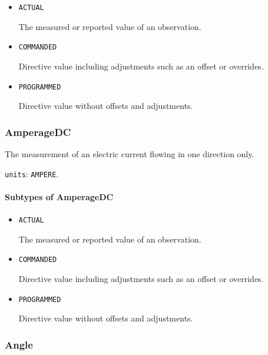 \begin{itemize}

\item \texttt{ACTUAL}


The measured or reported value of an \gls{observation}.

\item \texttt{COMMANDED}


Directive value including adjustments such as an offset or overrides.

\item \texttt{PROGRAMMED}


Directive value without offsets and adjustments.


\end{itemize}






\subsubsection{AmperageDC}
\label{sec:AmperageDC}



The measurement of an electric current flowing in one direction only.


\texttt{units}: \texttt{AMPERE}.

\paragraph{Subtypes of AmperageDC}\mbox{}
\label{sec:Subtypes of AmperageDC}

\begin{itemize}

\item \texttt{ACTUAL}


The measured or reported value of an \gls{observation}.

\item \texttt{COMMANDED}


Directive value including adjustments such as an offset or overrides.

\item \texttt{PROGRAMMED}


Directive value without offsets and adjustments.


\end{itemize}






\subsubsection{Angle}
\label{sec:Angle}



